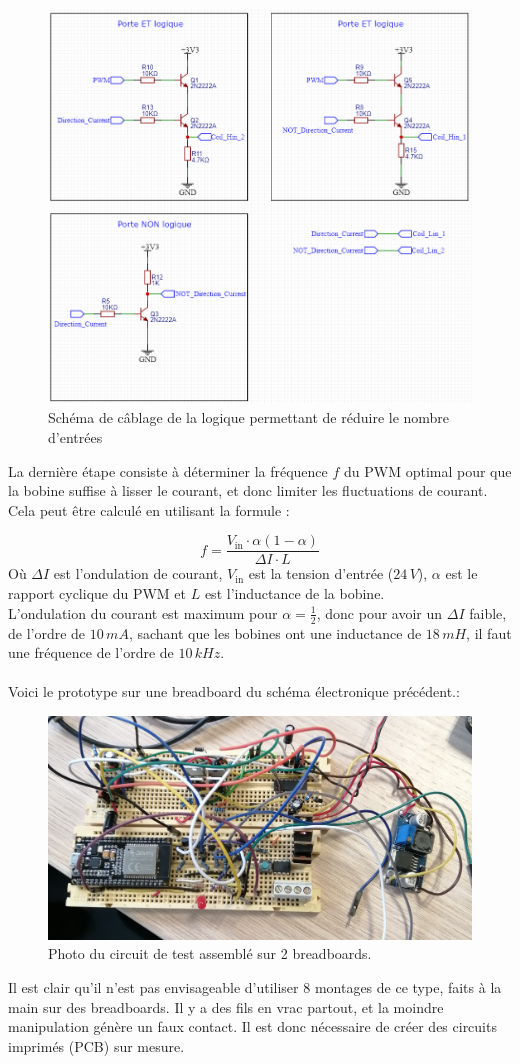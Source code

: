 \documentclass{article}
\begin{document}
    \begin{figure}[H]
    \centering
    \includegraphics[width=0.45\linewidth]{Images/portes_logiques.png}
    \caption{Schéma de câblage de la logique permettant de réduire le nombre d'entrées
    }
    \label{fig:reduced_input_logic_circuit}
\end{figure}
\noindent
La dernière étape consiste à déterminer la fréquence \( f \) du PWM optimal pour que la bobine suffise à lisser le courant, et donc limiter les fluctuations de courant. Cela peut être calculé en utilisant la formule :

\[ f = \frac{V_{\text{in}} \cdot \alpha(1-\alpha)}{\Delta I \cdot L} \]
Où \( \Delta I \) est l'ondulation de courant, \( V_{\text{in}} \) est la tension d'entrée (\(24\,V\)), \( \alpha \) est le rapport cyclique du PWM et \( L \) est l'inductance de la bobine.
\\
L'ondulation du courant est maximum pour \( \alpha = \frac{1}{2} \), donc pour avoir un \( \Delta I \) faible, de l'ordre de \(10\,mA\), sachant que les bobines ont une inductance de \(18\,mH\), il faut une fréquence de l'ordre de \(10\,kHz\).
\\\\
Voici le prototype sur une breadboard du schéma électronique précédent.:

    \begin{figure}[H]
    \centering
    \includegraphics[width=0.5\linewidth]{Images/breadboard.png}
    \caption{Photo du circuit de test assemblé sur 2 breadboards.}
    \label{fig:proto_circuit}
\end{figure}
\noindent
Il est clair qu'il n'est pas envisageable d'utiliser 8 montages de ce type, faits à la main sur des breadboards. Il y a des fils en vrac partout, et la moindre manipulation génère un faux contact. Il est donc nécessaire de créer des circuits imprimés (PCB) sur mesure.
\end{document}

